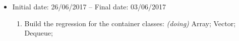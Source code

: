 \documentclass[11pt]{article}
\begin{document}
\begin{itemize}
	\item Initial date: 26/06/2017 -- Final date: 03/06/2017
	\begin{enumerate}
		\item Build the regression for the container classes: {\it (doing)}
		    \subitem Array;
		    \subitem Vector;
		    \subitem Dequeue;
		
	\end{enumerate}
	
	
\end{itemize}
\end{document}
